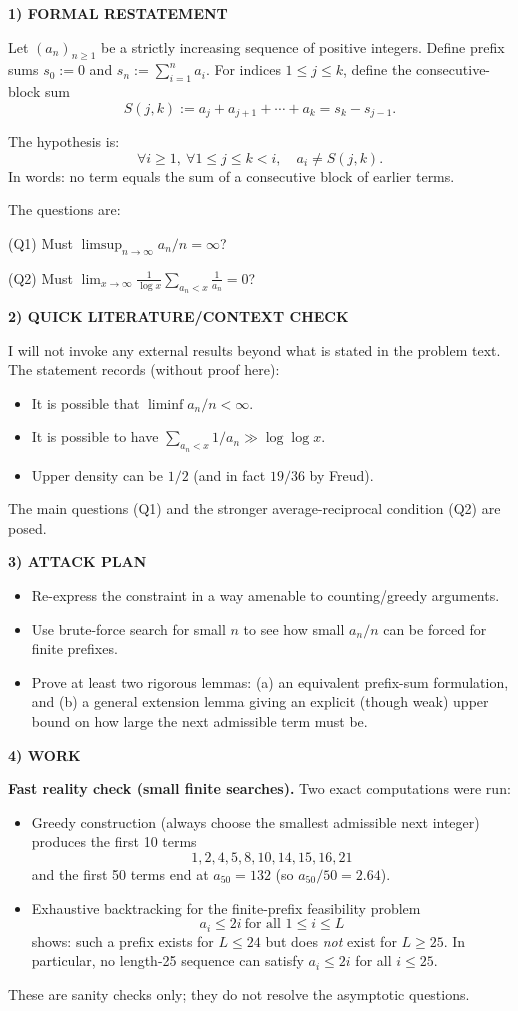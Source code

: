 \medskip
\noindent\textbf{1) FORMAL RESTATEMENT}

Let $(a_n)_{n\ge 1}$ be a strictly increasing sequence of positive integers.
Define prefix sums $s_0:=0$ and $s_n:=\sum_{i=1}^n a_i$.
For indices $1\le j\le k$, define the consecutive-block sum
\[
S(j,k):=a_j+a_{j+1}+\cdots+a_k = s_k-s_{j-1}.
\]

The hypothesis is:
\[
\forall i\ge 1,\ \forall 1\le j\le k < i,\quad a_i \neq S(j,k).
\]
In words: no term equals the sum of a consecutive block of earlier terms.

The questions are:

(Q1) Must $\limsup_{n\to\infty} a_n/n = \infty$?

(Q2) Must $\lim_{x\to\infty} \frac{1}{\log x}\sum_{a_n<x}\frac{1}{a_n}=0$?

\medskip
\noindent\textbf{2) QUICK LITERATURE/CONTEXT CHECK}

I will not invoke any external results beyond what is stated in the problem text.
The statement records (without proof here):
\begin{itemize}
\item It is possible that $\liminf a_n/n<\infty$.
\item It is possible to have $\sum_{a_n<x} 1/a_n \gg \log\log x$.
\item Upper density can be $1/2$ (and in fact $19/36$ by Freud).
\end{itemize}
The main questions (Q1) and the stronger average-reciprocal condition (Q2) are posed.

\medskip
\noindent\textbf{3) ATTACK PLAN}

\begin{itemize}
\item Re-express the constraint in a way amenable to counting/greedy arguments.
\item Use brute-force search for small $n$ to see how small $a_n/n$ can be forced for finite prefixes.
\item Prove at least two rigorous lemmas: (a) an equivalent prefix-sum formulation, and (b) a general extension lemma giving an explicit (though weak) upper bound on how large the next admissible term must be.
\end{itemize}

\medskip
\noindent\textbf{4) WORK}

\textbf{Fast reality check (small finite searches).}
Two exact computations were run:
\begin{itemize}
\item Greedy construction (always choose the smallest admissible next integer) produces the first 10 terms
\[
1,2,4,5,8,10,14,15,16,21
\]
and the first 50 terms end at $a_{50}=132$ (so $a_{50}/50=2.64$).
\item Exhaustive backtracking for the finite-prefix feasibility problem
\[a_i\le 2i\ \text{for all }1\le i\le L\]
shows: such a prefix exists for $L\le 24$ but does \emph{not} exist for $L\ge 25$.
In particular, no length-25 sequence can satisfy $a_i\le 2i$ for all $i\le 25$.
\end{itemize}
These are sanity checks only; they do not resolve the asymptotic questions.

